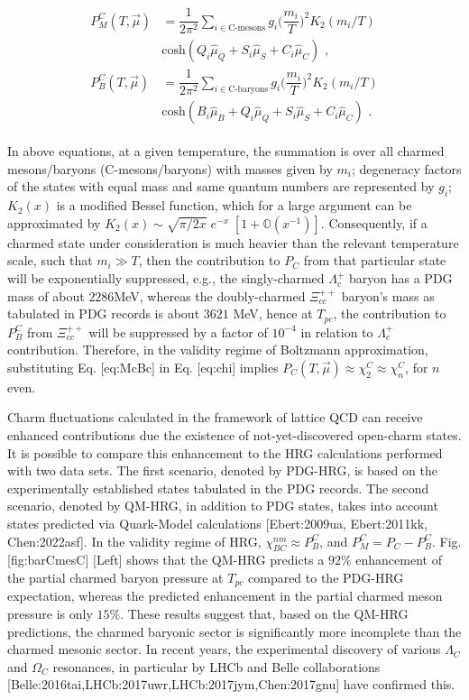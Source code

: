 \documentclass[11pt,a4paper]{article}
\begin{document}
$$\begin{gather}
	\begin{aligned}
		{P^C_{M}(T,\overrightarrow{\mu})}&{=\dfrac{1}{2\pi^2}\sum_{i\in \text{C-mesons}}g_i \bigg(\dfrac{m_i}{T}\bigg)^2K_2(m_i/T)}\\
			&{\text{cosh}(Q_i\hat{\mu}_Q+S_i\hat{\mu}_S+C_i\hat{\mu}_C)} \text{ ,}\\
		{P^C_{B}(T,\overrightarrow{\mu})}&={\dfrac{1}{2\pi^2}\sum_{i\in \text{C-baryons}}g_i \bigg(\dfrac{m_i}{T}\bigg)^2K_2(m_i/T)}\\
			&{\text{cosh}(B_i\hat{\mu}_B+Q_i\hat{\mu}_Q+S_i\hat{\mu}_S+C_i\hat{\mu}_C)} \text{ .}
		
	\end{aligned}
\end{gather}$$

In above equations, at a given temperature, the summation is over all charmed mesons/baryons (C-mesons/baryons) with masses given by ${m_i}$; degeneracy factors of the states with equal mass and same quantum numbers are represented by ${g_i}$; ${K_2(x)}$ is a modified Bessel function, which for a large argument can be approximated by ${K_2(x)}\sim\sqrt{\pi/2x}\;e^{-x}\;[1+\mathbb{O}(x^{-1})]$. Consequently, if a charmed state under consideration is much heavier than the relevant temperature scale, such that ${m_i\gg T}$, then the contribution to ${P_C}$ from that particular state will be exponentially suppressed, e.g., the singly-charmed ${\Lambda}_c^{+}$ baryon has a PDG mass of about $2286$MeV, whereas the doubly-charmed ${\Xi_{cc}^{++}}$ baryon's mass as tabulated in PDG records is about $3621$ MeV, hence at ${T_{pc}}$, the contribution to ${P^C_{B}}$ from ${\Xi_{cc}^{++}}$ will be suppressed by a factor of $10^{-4}$ in relation to ${\Lambda}_c^{+}$ contribution. Therefore, in the validity regime of Boltzmann approximation, substituting Eq. [eq:McBc] in Eq. [eq:chi] implies $P_C(T,\vec{\mu})\approx\chi_2^C\approx\chi_n^C$, for $n$ even.

Charm fluctuations calculated in the framework of lattice QCD can receive enhanced contributions due the existence of not-yet-discovered open-charm states. It is possible to compare this enhancement to the HRG calculations performed with two data sets. The first scenario, denoted by PDG-HRG, is based on the experimentally established states tabulated in the PDG records. The second scenario, denoted by QM-HRG, in addition to PDG states, takes into account states predicted via Quark-Model calculations [Ebert:2009ua, Ebert:2011kk, Chen:2022asf]. In the validity regime of HRG, $\chi^{nm}_{BC}\approx P^C_{B}$, and $P^C_{M} = P_C-P^C_{B}$. Fig. [fig:barCmesC] [Left] shows that the QM-HRG predicts a $92\%$ enhancement of the partial charmed baryon pressure at $T_{pc}$ compared to the PDG-HRG expectation, whereas the predicted enhancement in the partial charmed meson pressure is only $15\%$. These results suggest that, based on the QM-HRG predictions, the charmed baryonic sector is significantly more incomplete than the charmed mesonic sector. In recent years, the experimental discovery of various $\Lambda_C$ and $\Omega_C$ resonances, in particular by LHCb and Belle collaborations [Belle:2016tai,LHCb:2017uwr,LHCb:2017jym,Chen:2017gnu] have confirmed this.
\end{document}
